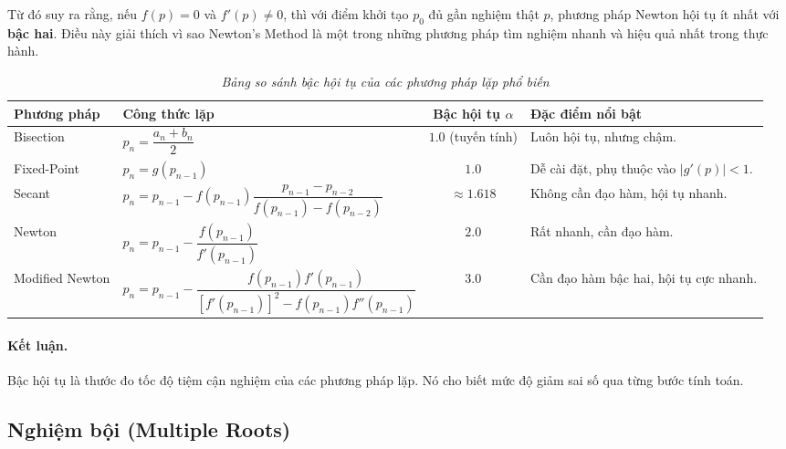 Từ đó suy ra rằng, nếu $f(p) = 0$ và $f'(p) \ne 0$, 
thì với điểm khởi tạo $p_0$ đủ gần nghiệm thật $p$, 
phương pháp Newton hội tụ ít nhất với \textbf{bậc hai}. 
Điều này giải thích vì sao Newton’s Method 
là một trong những phương pháp tìm nghiệm nhanh và hiệu quả nhất trong thực hành.

\captionsetup[table]{skip=10pt}
\begin{table}[H]
\centering
\caption{\textit{Bảng so sánh bậc hội tụ của các phương pháp lặp phổ biến}}
\label{tab:order_of_convergence}
\begin{adjustbox}{max width=\textwidth}
\begin{tabular}{|l|l|c|l|}
\hline
\textbf{Phương pháp} & \textbf{Công thức lặp} & \textbf{Bậc hội tụ $\alpha$} & \textbf{Đặc điểm nổi bật} \\ \hline
Bisection 
& $p_{n} = \dfrac{a_n + b_n}{2}$ 
& $1.0$ (tuyến tính) 
& Luôn hội tụ, nhưng chậm. \\ \hline

Fixed-Point 
& $p_n = g(p_{n-1})$ 
& $1.0$ 
& Dễ cài đặt, phụ thuộc vào $|g'(p)| < 1$. \\ \hline

Secant 
& $p_n = p_{n-1} - f(p_{n-1}) 
\dfrac{p_{n-1} - p_{n-2}}{f(p_{n-1}) - f(p_{n-2})}$ 
& $\approx 1.618$ 
& Không cần đạo hàm, hội tụ nhanh. \\ \hline

Newton 
& $p_n = p_{n-1} - \dfrac{f(p_{n-1})}{f'(p_{n-1})}$ 
& $2.0$ 
& Rất nhanh, cần đạo hàm. \\ \hline

Modified Newton 
& $p_n = p_{n-1} - 
\dfrac{f(p_{n-1}) f'(p_{n-1})}
{[f'(p_{n-1})]^2 - f(p_{n-1}) f''(p_{n-1})}$ 
& $3.0$ 
& Cần đạo hàm bậc hai, hội tụ cực nhanh. \\ \hline
\end{tabular}
\end{adjustbox}
\end{table}

\paragraph*{Kết luận.}
Bậc hội tụ là thước đo tốc độ tiệm cận nghiệm của các phương pháp lặp. 
Nó cho biết mức độ giảm sai số qua từng bước tính toán.

\subsection{Nghiệm bội (Multiple Roots)}


